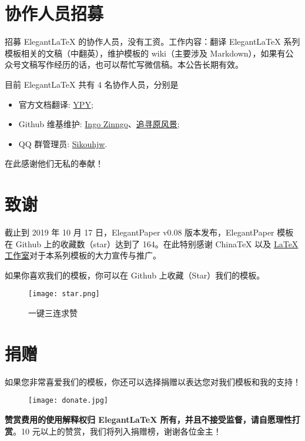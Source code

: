 \documentclass[lang=cn,11pt,a4paper]{elegantpaper}
\begin{document}
\section{协作人员招募}
招募 Elegant\LaTeX{} 的协作人员，没有工资。工作内容：翻译 Elegant\LaTeX{} 系列模板相关的文稿（中翻英），维护模板的 wiki（主要涉及 Markdown），如果有公众号文稿写作经历的话，也可以帮忙写微信稿。本公告长期有效。

目前 ElegantLaTeX 共有 4 名协作人员，分别是
\begin{itemize}
  \item 官方文档翻译: \href{https://github.com/peggy2006xzyz}{YPY};
  \item Github 维基维护: \href{https://github.com/izinngo}{Ingo Zinngo}、\href{https://github.com/xiaohao890809}{追寻原风景};
  \item QQ 群管理员: \href{https://github.com/sikouhjw}{Sikouhjw}.
\end{itemize}

在此感谢他们无私的奉献！


\section{致谢}
截止到 2019 年 10 月 17 日，ElegantPaper v0.08 版本发布，ElegantPaper 模板在 Github 上的收藏数（star）达到了 164。在此特别感谢 China\TeX{} 以及 \href{http://www.latexstudio.net/}{\LaTeX{} 工作室}对于本系列模板的大力宣传与推广。

如果你喜欢我们的模板，你可以在 Github 上收藏（Star）我们的模板。
\begin{figure}[htbp]
  \centering
  \texttt{[image: star.png]}
  \caption{一键三连求赞}
\end{figure}

\section{捐赠}
如果您非常喜爱我们的模板，你还可以选择捐赠以表达您对我们模板和我的支持！

\begin{figure}[htbp]
  \centering
  \texttt{[image: donate.jpg]}
\end{figure}

\textbf{赞赏费用的使用解释权归 Elegant\LaTeX{} 所有，并且不接受监督，请自愿理性打赏}。10 元以上的赞赏，我们将列入捐赠榜，谢谢各位金主！
\end{document}
